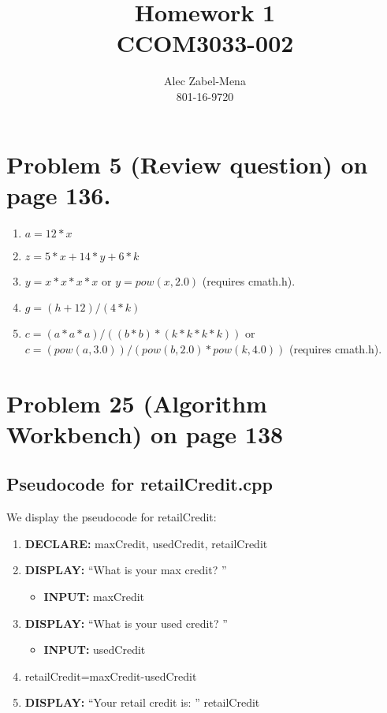 \documentclass[10pt]{article}
\begin{document}
\title{Homework 1 \\ CCOM3033-002}
\author{Alec Zabel-Mena \\801-16-9720}
\maketitle

\section{Problem 5 (Review question) on page 136.}

\begin{enumerate}
    \item $a = 12*x$

    \item $z= 5*x+14*y+6*k$

    \item $y = x*x*x*x$ or $y=pow(x,2.0)$ (requires cmath.h).

    \item $g = (h+12)/(4*k)$

    \item $c = (a*a*a)/((b*b)*(k*k*k*k))$ or $c = (pow(a,3.0))/(pow(b,2.0)*
        pow(k,4.0))$ (requires cmath.h). 
\end{enumerate}

\section{Problem 25 (Algorithm Workbench) on page 138}
\subsection{Pseudocode for retailCredit.cpp}

We display the pseudocode for retailCredit:

\begin{enumerate}
    \item \textbf{DECLARE:} maxCredit, usedCredit, retailCredit

    \item \textbf{DISPLAY:} ``What is your max credit? ''
        \begin{itemize}
            \item \textbf{INPUT:} maxCredit
        \end{itemize}

    \item \textbf{DISPLAY:} ``What is your used credit? ''
        \begin{itemize}
            \item \textbf{INPUT:} usedCredit
        \end{itemize}

    \item retailCredit=maxCredit-usedCredit

    \item \textbf{DISPLAY:} ``Your retail credit is: '' retailCredit

\end{enumerate}
\end{document}
